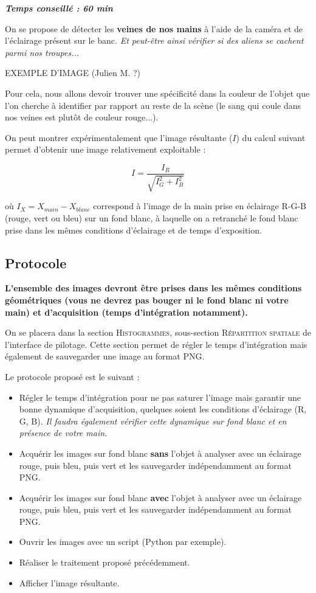 \documentclass[a4paper,11pt,titlepage]{article} %
\begin{document}
\begin{center} \textbf{\textit{Temps conseillé : 60 min}} \end{center}

On se propose de détecter les \textbf{veines de nos mains} à l'aide de la caméra et de l'éclairage présent sur le banc. \textit{Et peut-être ainsi vérifier si des aliens se cachent parmi nos troupes...}

EXEMPLE D'IMAGE (Julien M. ?)

Pour cela, nous allons devoir trouver une spécificité dans la couleur de l'objet que l'on cherche à identifier par rapport au reste de la scène (le sang qui coule dans nos veines est plutôt de couleur rouge...).

On peut montrer expérimentalement que l'image résultante ($I$) du calcul suivant permet d'obtenir une image relativement exploitable :

$$I = \frac{I_R}{\sqrt{I_G^2 + I_B^2}}$$

où $I_X = X_{main} - X_{blanc}$ correspond à l'image de la main prise en éclairage R-G-B (rouge, vert ou bleu) sur un fond blanc, à laquelle on a retranché le fond blanc prise dans les mêmes conditions d'éclairage et de temps d'exposition.

\subsection{Protocole}

\textbf{L'ensemble des images devront être prises dans les mêmes conditions géométriques (vous ne devrez pas bouger ni le fond blanc ni votre main) et d'acquisition (temps d'intégration notamment).}

On se placera dans la section \textsc{Histogrammes}, sous-section \textsc{Répartition spatiale} de l'interface de pilotage. Cette section permet de régler le temps d'intégration mais également de sauvegarder une image au format PNG.

\medskip

Le protocole proposé est le suivant :

\begin{itemize}
	\item Régler le temps d'intégration pour ne pas saturer l'image mais garantir une bonne dynamique d'acquisition, quelques soient les conditions d'éclairage (R, G, B). \textit{Il faudra également vérifier cette dynamique sur fond blanc et en présence de votre main.}
	\item Acquérir les images sur fond blanc \textbf{sans} l'objet à analyser avec un éclairage rouge, puis bleu, puis vert et les sauvegarder indépendamment au format PNG.
	\item Acquérir les images sur fond blanc \textbf{avec} l'objet à analyser avec un éclairage rouge, puis bleu, puis vert et les sauvegarder indépendamment au format PNG.
	\item Ouvrir les images avec un script (Python par exemple).
	\item Réaliser le traitement proposé précédemment.
	\item Afficher l'image résultante.
\end{itemize}
\end{document}
